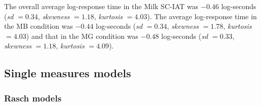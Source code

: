 \documentclass[12pt]{book}
\begin{document}
The overall average log-response time in the Milk SC-IAT was $-0.46$ log-seconds (\emph{sd} $= 0.34$, \emph{skewness} $= 1.18$, \emph{kurtosis} $= 4.03$). The average log-response time in the MB condition was $-0.44$ log-seconds (\emph{sd} $= 0.34$, \emph{skewness} $= 1.78$, \emph{kurtosis} $= 4.03$) and that in the MG condition was $-0.48$ log-seconds (\emph{sd} $= 0.33$, \emph{skewness} $= 1.18$, \emph{kurtosis} $= 4.09$).


\subsection{Single measures models} 

\subsubsection{Rasch models}
\end{document}
